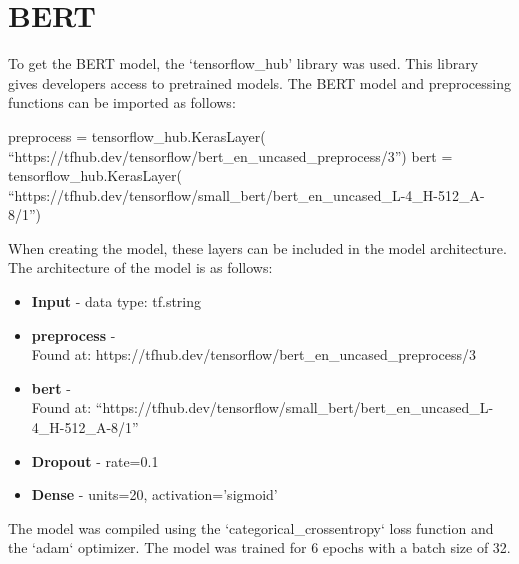 \section{BERT}
To get the BERT model, the `tensorflow\_hub' library was used. This library gives developers access to pretrained models. The BERT model and preprocessing functions
can be imported as follows:
\begin{algorithm}
    \begin{algorithmic}
        \STATE preprocess = tensorflow\_hub.KerasLayer(
        \bindent
        \STATE ``https://tfhub.dev/tensorflow/bert\_en\_uncased\_preprocess/3'')
        \eindent
        \STATE bert = tensorflow\_hub.KerasLayer(
        \bindent
        \STATE``https://tfhub.dev/tensorflow/small\_bert/bert\_en\_uncased\_L-4\_H-512\_A-8/1'')
        \eindent
    \end{algorithmic}
\end{algorithm}

When creating the model, these layers can be included in the model architecture. The architecture of the model is as follows:
\begin{itemize}
    \item \textbf{Input} - data type: tf.string
    \item \textbf{preprocess} - \\Found at: https://tfhub.dev/tensorflow/bert\_en\_uncased\_preprocess/3
    \item \textbf{bert} - \\Found at: ``https://tfhub.dev/tensorflow/small\_bert/bert\_en\_uncased\_L-4\_H-512\_A-8/1''
    \item \textbf{Dropout} - rate=0.1
    \item \textbf{Dense} - units=20, activation='sigmoid'
\end{itemize}

The model was compiled using the `categorical\_crossentropy` loss function and the `adam` optimizer. The model was trained for 6 epochs with a batch size of 32.
